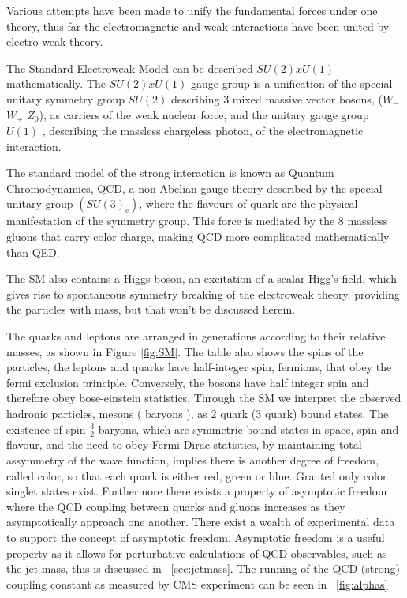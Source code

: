 Various attempts have been made to unify the fundamental forces under one theory, thus far the electromagnetic and weak interactions have been united by electro-weak theory. 

The Standard Electroweak Model can be described $SU(2) x U(1)$ mathematically.
The  $SU(2) x U(1)$ gauge group is a unification of the special unitary symmetry group $SU(2)$ describing 3 mixed massive vector bosons, ($W_{-}$ $W_{+}$ $Z_0$), as carriers of the weak nuclear force, and the unitary gauge group $U(1)$ , describing the massless chargeless photon, of the electromagnetic interaction.

The standard model of the strong interaction is known as Quantum Chromodynamics, QCD, a non-Abelian gauge theory described by the special unitary group $(SU(3)_c)$, where the flavours of quark are the physical manifestation of the symmetry group. This force is mediated by the 8 massless gluons that carry color charge, making QCD more complicated mathematically than QED.

The SM also contains a Higgs boson, an excitation of a scalar Higg's field, which gives rise to spontaneous symmetry breaking of the electroweak theory, providing the particles with mass, but that won't be discussed herein. 

The quarks and leptons are arranged in generations according to their relative masses, as shown in Figure \ref{fig:SM}. The table also shows the spins of the particles, the leptons and quarks have half-integer spin, fermions, that obey the fermi exclusion principle. Conversely, the bosons have half integer spin and therefore obey bose-einstein statistics. Through the SM we interpret the observed hadronic particles, mesons ( baryons ), as 2 quark (3 quark) bound states. The existence of spin $\frac{3}{2}$ baryons, which are symmetric bound states in space, spin and flavour, and the need to obey Fermi-Dirac statistics, by maintaining total assymmetry of the wave function, implies there is another degree of freedom, called color, so that each quark is either red, green or blue. Granted only color singlet states exist. Furthermore there exists a property of asymptotic freedom where the QCD coupling between quarks and gluons increases as they asymptotically approach one another. There exist a wealth of experimental data to support the concept of asymptotic freedom. Asymptotic freedom is a useful property as it allows for perturbative calculations of QCD observables, such as the jet mass, this is discussed in ~\ref{sec:jetmass}. The running of the QCD (strong) coupling constant as measured by CMS experiment can be seen in ~\ref{fig:alphas}


